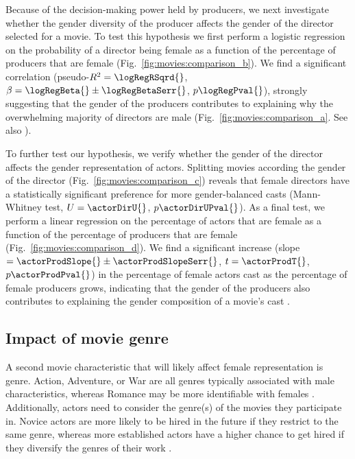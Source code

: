 Because of the decision-making power held by producers, we next investigate whether the gender diversity of the producer affects the gender of the director selected for a movie. To test this hypothesis we first perform a logistic regression on the probability of a director being female as a function of the percentage of producers that are female (Fig.~\ref{fig:movies:comparison_b}). We find a significant correlation (pseudo-$R^2 = \logRegRSqrd{}$, $\beta = \logRegBeta{} \pm \logRegBetaSerr{}$, $p \logRegPval{}$), strongly suggesting that the gender of the producers contributes to explaining why the overwhelming majority of directors are male (Fig.~\ref{fig:movies:comparison_a}. See also \cite{Grugulis2012}).

To further test our hypothesis, we verify whether the gender of the director affects the gender representation of actors. Splitting movies according the gender of the director (Fig.~\ref{fig:movies:comparison_c}) reveals that female directors have a statistically significant preference for more gender-balanced casts (Mann-Whitney test, $U = \actorDirU{}$, $p \actorDirUPval{}$). As a final test, we perform a linear regression on the percentage of actors that are female as a function of the percentage of producers that are female (Fig.~\ref{fig:movies:comparison_d}). We find a significant increase (slope $ = \actorProdSlope{} \pm \actorProdSlopeSerr{}$, $t = \actorProdT{}$, $p \actorProdPval{}$) in the percentage of female actors cast as the percentage of female producers grows, indicating that the gender of the producers also contributes to explaining the gender composition of a movie's cast \cite{Lauzen1999,Smith2016}.


\subsection{Impact of movie genre}

A second movie characteristic that will likely affect female representation is genre. Action, Adventure, or War are all genres typically associated with male characteristics, whereas Romance may be more identifiable with females \cite{Smith2014,Wuhr2017}. Additionally, actors need to consider the genre(s) of the movies they participate in. Novice actors are more likely to be hired in the future if they restrict to the same genre, whereas more established actors have a higher chance to get hired if they diversify the genres of their work \cite{Zuckerman2003}.

